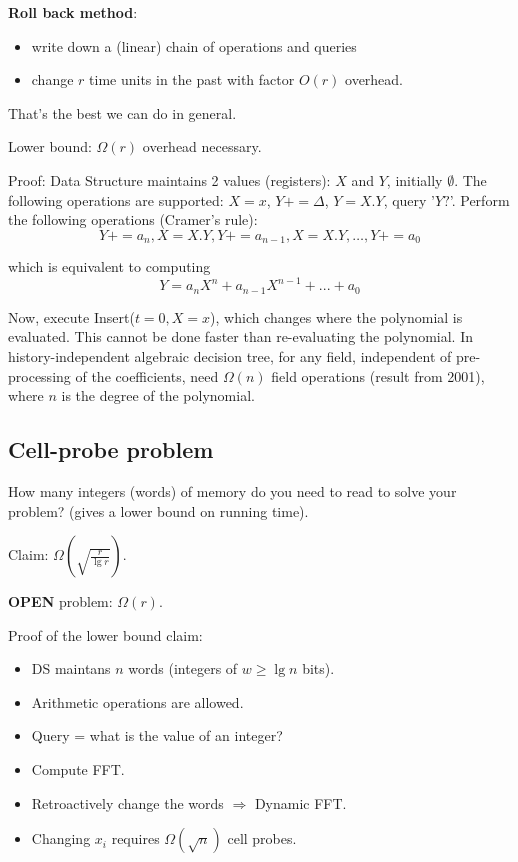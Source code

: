 \documentclass[11pt]{article}
\begin{document}
{\bf Roll back method}: 
\begin{itemize}
\item write down a (linear) chain of operations and queries
\item change $r$ time units in the past with factor $O(r)$ overhead. 
\end{itemize}

That's the best we can do in general. 

Lower bound: $\Omega (r)$ overhead necessary.

Proof: Data Structure maintains 2 values (registers): $X$ and $Y$, initially $\emptyset$. The following operations are supported: $X = x$, $Y += \Delta$, $Y = X.Y$, query '$Y?$'. Perform the following operations (Cramer's rule):
$$Y += a_n, X = X.Y, Y += a_{n-1}, X = X.Y, \ldots, Y += a_0$$


which is equivalent to computing $$Y = a_n X^{n} + a_{n-1} X^{n-1} + ... + a_0$$

Now, execute Insert($t = 0, X=x$), which changes where the polynomial is evaluated. This cannot be done faster than re-evaluating the polynomial. In history-independent algebraic decision tree, for any field, independent of pre-processing of the coefficients, need $\Omega(n)$ field operations (result from 2001), where $n$ is the degree of the polynomial.

\subsection{Cell-probe problem}

How many integers (words) of memory do you need to read to solve your problem? (gives a lower bound on running time).

Claim: $\Omega(\sqrt{\frac{r}{\lg{r}}})$.

{\bf OPEN} problem: $\Omega(r)$.

Proof of the lower bound claim:
\begin{itemize}
\item DS maintans $n$ words (integers of $w \ge \lg{n}$ bits). 
\item Arithmetic operations are allowed. 
\item Query = what is the value of an integer?
\item Compute FFT. 
\item Retroactively change the words $\Rightarrow$ Dynamic FFT. 
\item Changing $x_i$ requires $\Omega(\sqrt{n})$ cell probes.
\end{itemize}
\end{document}
